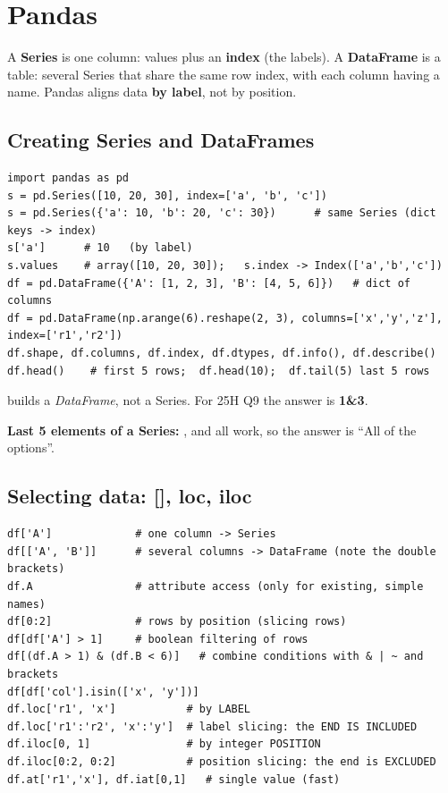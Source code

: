 \newpage
\section{Pandas}

\begin{idea}
A \textbf{Series} is one column: values plus an \textbf{index} (the labels). A \textbf{DataFrame} is a table: several Series that share the same row index, with each column having a name.
Pandas aligns data \textbf{by label}, not by position.
\end{idea}

\subsection{Creating Series and DataFrames}
\begin{codebox}
\begin{Verbatim}
import pandas as pd
s = pd.Series([10, 20, 30], index=['a', 'b', 'c'])
s = pd.Series({'a': 10, 'b': 20, 'c': 30})      # same Series (dict keys -> index)
s['a']      # 10   (by label)
s.values    # array([10, 20, 30]);   s.index -> Index(['a','b','c'])
df = pd.DataFrame({'A': [1, 2, 3], 'B': [4, 5, 6]})   # dict of columns
df = pd.DataFrame(np.arange(6).reshape(2, 3), columns=['x','y','z'], index=['r1','r2'])
df.shape, df.columns, df.index, df.dtypes, df.info(), df.describe()
df.head()    # first 5 rows;  df.head(10);  df.tail(5) last 5 rows
\end{Verbatim}
\end{codebox}
 builds a \emph{DataFrame}, not a Series.
For 25H Q9 the answer is \textbf{1\&3}.

\textbf{Last 5 elements of a Series:} ,  and  all work, so the answer is ``All of the options''.

\subsection{Selecting data: [], loc, iloc}
\begin{codebox}
\begin{Verbatim}
df['A']             # one column -> Series
df[['A', 'B']]      # several columns -> DataFrame (note the double brackets)
df.A                # attribute access (only for existing, simple names)
df[0:2]             # rows by position (slicing rows)
df[df['A'] > 1]     # boolean filtering of rows
df[(df.A > 1) & (df.B < 6)]   # combine conditions with & | ~ and brackets
df[df['col'].isin(['x', 'y'])]
df.loc['r1', 'x']           # by LABEL
df.loc['r1':'r2', 'x':'y']  # label slicing: the END IS INCLUDED
df.iloc[0, 1]               # by integer POSITION
df.iloc[0:2, 0:2]           # position slicing: the end is EXCLUDED
df.at['r1','x'], df.iat[0,1]   # single value (fast)
\end{Verbatim}
\end{codebox}

